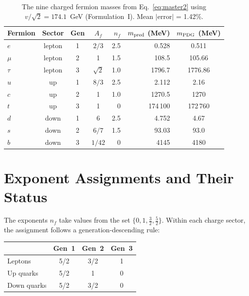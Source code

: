 \documentclass[11pt,a4paper]{article}
\theoremstyle{definition}
\theoremstyle{remark}
\begin{document}
\begin{table}[h]
\centering
\renewcommand{\arraystretch}{1.15}
\begin{tabular}{lcccrrc}
\toprule
Fermion & Sector & Gen & $A_f$ & $n_f$ & $m_{\rm pred}$ (MeV)
  & $m_{\rm PDG}$ (MeV) \\
\midrule
$e$   & lepton & 1 & $2/3$      & 2.5 & 0.528   & 0.511   \\
$\mu$ & lepton & 2 & 1          & 1.5 & 108.5   & 105.66  \\
$\tau$& lepton & 3 & $\sqrt{2}$ & 1.0 & 1796.7  & 1776.86 \\[3pt]
$u$   & up     & 1 & $8/3$      & 2.5 & 2.112   & 2.16    \\
$c$   & up     & 2 & 1          & 1.0 & 1270.5  & 1270    \\
$t$   & up     & 3 & 1          & 0   & 174\,100& 172\,760\\[3pt]
$d$   & down   & 1 & 6          & 2.5 & 4.752   & 4.67    \\
$s$   & down   & 2 & $6/7$      & 1.5 & 93.03   & 93.0    \\
$b$   & down   & 3 & $1/42$     & 0   & 4145    & 4180    \\
\bottomrule
\end{tabular}
\caption{The nine charged fermion masses from Eq.~\eqref{eq:master2}
  using $v/\!\sqrt{2} = 174.1$~GeV (Formulation~I).
  Mean $|$error$|$ = 1.42\%.}
\label{tab:masses}
\end{table}

\section{Exponent Assignments and Their Status}
\label{sec:exponents}

The exponents $n_f$ take values from the set
$\{0, 1, \tfrac{3}{2}, \tfrac{5}{2}\}$.
Within each charge sector, the assignment follows a
generation-descending rule:

\begin{center}
\begin{tabular}{lccc}
\toprule
& Gen~1 & Gen~2 & Gen~3 \\
\midrule
Leptons     & 5/2 & 3/2 & 1 \\
Up quarks   & 5/2 & 1   & 0 \\
Down quarks & 5/2 & 3/2 & 0 \\
\bottomrule
\end{tabular}
\end{center}
\end{document}
